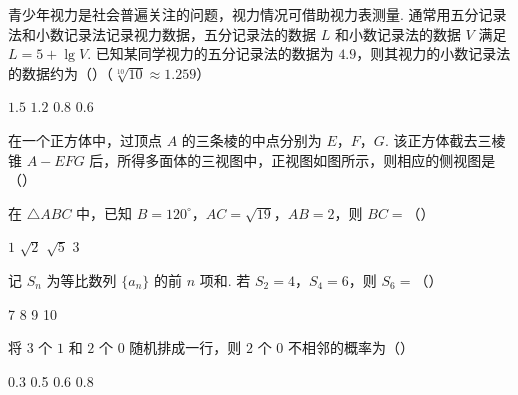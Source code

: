 \begin{problem}
青少年视力是社会普遍关注的问题，视力情况可借助视力表测量. 通常用五分记录法和小数记录法记录视力数据，五分记录法的数据 \(L\) 和小数记录法的数据 \(V\) 满足 \(L=5+\lg V\). 已知某同学视力的五分记录法的数据为 \(4.9\)，则其视力的小数记录法的数据约为（\quad）（\(\sqrt[10]{10}\approx 1.259\)）

\choices
    {\(1.5\)}
    {\(1.2\)}
    {\(0.8\)}
    {\(0.6\)}

\end{problem}

\begin{problem}
在一个正方体中，过顶点 \(A\) 的三条棱的中点分别为 \(E\)，\(F\)，\(G\). 该正方体截去三棱锥 \(A-EFG\) 后，所得多面体的三视图中，正视图如图所示，则相应的侧视图是（\quad）


    {}
    {}
    {}

\end{problem}

\begin{problem}
在 \(\triangle ABC\) 中，已知 \(B=120^\circ\)，\(AC=\sqrt{19}\)，\(AB=2\)，则 \(BC=\)（\quad）

\choices
    {\(1\)}
    {\(\sqrt{2}\)}
    {\(\sqrt{5}\)}
    {\(3\)}

\end{problem}

\begin{problem}
记 \(S_n\) 为等比数列 \(\{a_n\}\) 的前 \(n\) 项和. 若 \(S_2=4\)，\(S_4=6\)，则 \(S_6=\)（\quad）

\choices
    {7}
    {8}
    {9}
    {10}

\end{problem}

\begin{problem}
将 \(3\) 个 \(1\) 和 \(2\) 个 \(0\) 随机排成一行，则 \(2\) 个 \(0\) 不相邻的概率为（\quad）

\choices
    {0.3}
    {0.5}
    {0.6}
    {0.8}

\end{problem}

